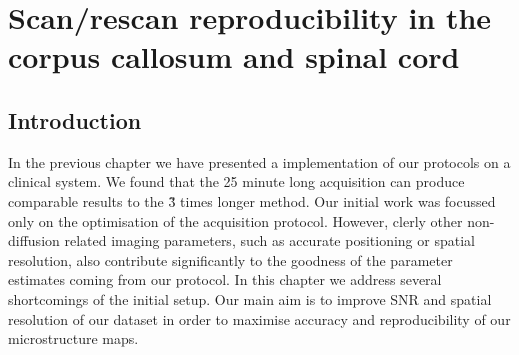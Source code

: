 %


\newsavebox{\poorBox}
\savebox{\poorBox}{\textcolor{red}{\rule{0.05in}{0.05in}}}
\newsavebox{\fairBox}
\savebox{\fairBox}{\textcolor{orange}{\rule{0.05in}{0.05in}}}
\newsavebox{\moderateBox}
\savebox{\moderateBox}{\textcolor{yellow}{\rule{0.05in}{0.05in}}}
\newsavebox{\substantialBox}
\savebox{\substantialBox}{\textcolor{lime}{\rule{0.05in}{0.05in}}}
\newsavebox{\perfectBox}
\savebox{\perfectBox}{\textcolor{green}{\rule{0.05in}{0.05in}}}


\chapter[Scan/rescan in the corpus callosum]{Scan/rescan reproducibility in the corpus callosum and spinal cord}
\section{Introduction}
In the previous chapter we have presented a implementation of our {\SFasym} protocols on a clinical system. We found that the 25 minute long \SFasym{} acquisition can produce comparable results to the \~3 times longer \OI{} method. Our initial work was focussed only on the optimisation of the acquisition protocol. However, clerly other non-diffusion related imaging parameters, such as accurate positioning or spatial resolution, also contribute significantly to the goodness of the parameter estimates coming from our protocol. In this chapter we address several shortcomings of the initial \SFasym{} setup. Our main aim is to improve SNR and spatial resolution of our dataset in order to maximise accuracy and  reproducibility of our microstructure maps. 


